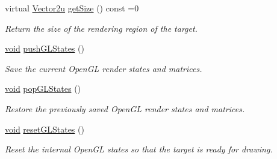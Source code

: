 \begin{DoxyCompactItemize}
virtual \hyperlink{namespacesf_aaa02ba42bf79b001a376fe9d79254cb3}{Vector2u} \hyperlink{classsf_1_1_render_target_a2e5ade2457d9fb4c4907ae5b3d9e94a5}{get\-Size} () const =0
\begin{DoxyCompactList}\small\item\em Return the size of the rendering region of the target. \end{DoxyCompactList}\item 
\hyperlink{glutf90_8h_ac778d6f63f1aaf8ebda0ce6ac821b56e}{void} \hyperlink{classsf_1_1_render_target_a8d1998464ccc54e789aaf990242b47f7}{push\-G\-L\-States} ()
\begin{DoxyCompactList}\small\item\em Save the current Open\-G\-L render states and matrices. \end{DoxyCompactList}\item 
\hyperlink{glutf90_8h_ac778d6f63f1aaf8ebda0ce6ac821b56e}{void} \hyperlink{classsf_1_1_render_target_ad5a98401113df931ddcd54c080f7aa8e}{pop\-G\-L\-States} ()
\begin{DoxyCompactList}\small\item\em Restore the previously saved Open\-G\-L render states and matrices. \end{DoxyCompactList}\item 
\hyperlink{glutf90_8h_ac778d6f63f1aaf8ebda0ce6ac821b56e}{void} \hyperlink{classsf_1_1_render_target_aac7504990d27dada4bfe3c7866920765}{reset\-G\-L\-States} ()
\begin{DoxyCompactList}\small\item\em Reset the internal Open\-G\-L states so that the target is ready for drawing. \end{DoxyCompactList}\end{DoxyCompactItemize}
